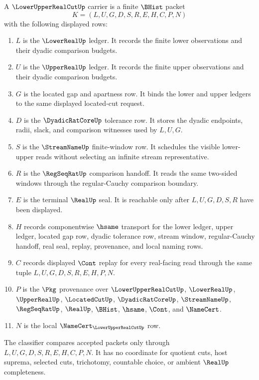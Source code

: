 \begin{definition}
\label{def:lower-upper-real-cut-carrier}
A $\LowerUpperRealCutUp$ carrier is a finite $\BHist$ packet
$$
K=(L,U,G,D,S,R,E,H,C,P,N)
$$
with the following displayed rows:
\begin{enumerate}
\item $L$ is the $\LowerRealUp$ ledger. It records the finite lower observations and their dyadic comparison budgets.
\item $U$ is the $\UpperRealUp$ ledger. It records the finite upper observations and their dyadic comparison budgets.
\item $G$ is the located gap and apartness row. It binds the lower and upper ledgers to the same displayed located-cut request.
\item $D$ is the $\DyadicRatCoreUp$ tolerance row. It stores the dyadic endpoints, radii, slack, and comparison witnesses used by $L,U,G$.
\item $S$ is the $\StreamNameUp$ finite-window row. It schedules the visible lower-upper reads without selecting an infinite stream representative.
\item $R$ is the $\RegSeqRatUp$ comparison handoff. It reads the same two-sided windows through the regular-Cauchy comparison boundary.
\item $E$ is the terminal $\RealUp$ seal. It is reachable only after $L,U,G,D,S,R$ have been displayed.
\item $H$ records componentwise $\hsame$ transport for the lower ledger, upper ledger, located gap row, dyadic tolerance row, stream window, regular-Cauchy handoff, real seal, replay, provenance, and local naming rows.
\item $C$ records displayed $\Cont$ replay for every real-facing read through the same tuple $L,U,G,D,S,R,E,H,P,N$.
\item $P$ is the $\Pkg$ provenance over $\LowerUpperRealCutUp$, $\LowerRealUp$, $\UpperRealUp$, $\LocatedCutUp$, $\DyadicRatCoreUp$, $\StreamNameUp$, $\RegSeqRatUp$, $\RealUp$, $\BHist$, $\hsame$, $\Cont$, and $\NameCert$.
\item $N$ is the local $\NameCert_{\LowerUpperRealCutUp}$ row.
\end{enumerate}
The classifier compares accepted packets only through $L,U,G,D,S,R,E,H,C,P,N$. It has no coordinate for quotient cuts, host suprema, selected cuts, trichotomy, countable choice, or ambient $\RealUp$ completeness.
\end{definition}


